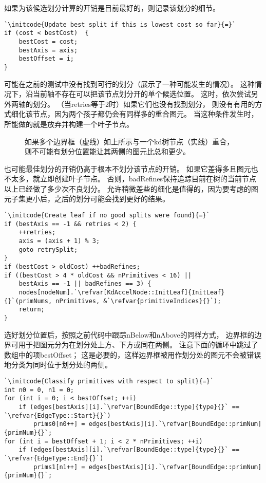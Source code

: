 如果为该候选划分计算的开销是目前最好的，则记录该划分的细节。
\begin{lstlisting}
`\initcode{Update best split if this is lowest cost so far}{=}`
if (cost < bestCost)  {
    bestCost = cost;
    bestAxis = axis;
    bestOffset = i;
}
\end{lstlisting}

可能在之前的测试中没有找到可行的划分（展示了一种可能发生的情况）。
这种情况下，沿当前轴不存在可以把该节点划分开的单个候选位置。
这时，依次尝试另外两轴的划分。
（当{\ttfamily retries}等于2时）如果它们也没有找到划分，
则没有有用的方式细化该节点，因为两个孩子都仍会有同样多的重合图元。
当这种条件发生时，所能做的就是放弃并构建一个叶子节点。
\begin{figure}[htbp]
    \centering
    \caption{如果多个边界框（虚线）如上所示与一个kd树节点（实线）重合，
    则不可能有划分位置能让其两侧的图元比总和更少。}
    \label{fig:4.16}
\end{figure}

也可能最佳划分的开销仍高于根本不划分该节点的开销。
如果它差得多且图元也不太多，就立即创建叶子节点。
否则，{\ttfamily badRefines}保持追踪目前在树的当前节点以上已经做了多少次不良划分。
允许稍微差些的细化是值得的，因为要考虑的图元子集更小后，之后的划分可能会找到更好的结果。
\begin{lstlisting}
`\initcode{Create leaf if no good splits were found}{=}`
if (bestAxis == -1 && retries < 2) {
    ++retries;
    axis = (axis + 1) % 3;
    goto retrySplit;
}
if (bestCost > oldCost) ++badRefines;
if ((bestCost > 4 * oldCost && nPrimitives < 16) ||
    bestAxis == -1 || badRefines == 3) {
    nodes[nodeNum].`\refvar[KdAccelNode::InitLeaf]{InitLeaf}{}`(primNums, nPrimitives, &`\refvar{primitiveIndices}{}`);
    return;
}
\end{lstlisting}

选好划分位置后，按照之前代码中跟踪{\ttfamily nBelow}和{\ttfamily nAbove}的同样方式，
边界框的边界可用于把图元分为在划分处上方、下方或同在两侧。
注意下面的循环中跳过了数组中的项{\ttfamily bestOffset}；
这是必要的，这样边界框被用作划分处的图元不会被错误地分类为同时位于划分处的两侧。
\begin{lstlisting}
`\initcode{Classify primitives with respect to split}{=}`
int n0 = 0, n1 = 0;
for (int i = 0; i < bestOffset; ++i)
    if (edges[bestAxis][i].`\refvar[BoundEdge::type]{type}{}` == `\refvar{EdgeType::Start}{}`)
        prims0[n0++] = edges[bestAxis][i].`\refvar[BoundEdge::primNum]{primNum}{}`;
for (int i = bestOffset + 1; i < 2 * nPrimitives; ++i)
    if (edges[bestAxis][i].`\refvar[BoundEdge::type]{type}{}` == `\refvar{EdgeType::End}{}`)
        prims1[n1++] = edges[bestAxis][i].`\refvar[BoundEdge::primNum]{primNum}{}`;
\end{lstlisting}


